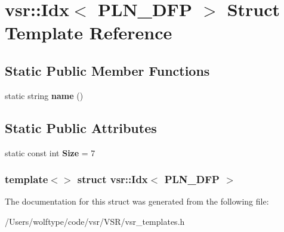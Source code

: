 \hypertarget{structvsr_1_1_idx_3_01_p_l_n___d_f_p_01_4}{\section{vsr\-:\-:Idx$<$ P\-L\-N\-\_\-\-D\-F\-P $>$ Struct Template Reference}
\label{structvsr_1_1_idx_3_01_p_l_n___d_f_p_01_4}
}
\subsection*{Static Public Member Functions}
\begin{DoxyCompactItemize}
\item 
\hypertarget{structvsr_1_1_idx_3_01_p_l_n___d_f_p_01_4_a201b4fc499ff1bd281abf39382e40cfb}{static string {\bfseries name} ()}\label{structvsr_1_1_idx_3_01_p_l_n___d_f_p_01_4_a201b4fc499ff1bd281abf39382e40cfb}

\end{DoxyCompactItemize}
\subsection*{Static Public Attributes}
\begin{DoxyCompactItemize}
\item 
\hypertarget{structvsr_1_1_idx_3_01_p_l_n___d_f_p_01_4_a14e1cb72c9eec642a1df9dc3dd0f5d4d}{static const int {\bfseries Size} = 7}\label{structvsr_1_1_idx_3_01_p_l_n___d_f_p_01_4_a14e1cb72c9eec642a1df9dc3dd0f5d4d}

\end{DoxyCompactItemize}
\subsubsection*{template$<$$>$ struct vsr\-::\-Idx$<$ P\-L\-N\-\_\-\-D\-F\-P $>$}



The documentation for this struct was generated from the following file\-:\begin{DoxyCompactItemize}
\item 
/\-Users/wolftype/code/vsr/\-V\-S\-R/vsr\-\_\-templates.\-h\end{DoxyCompactItemize}
